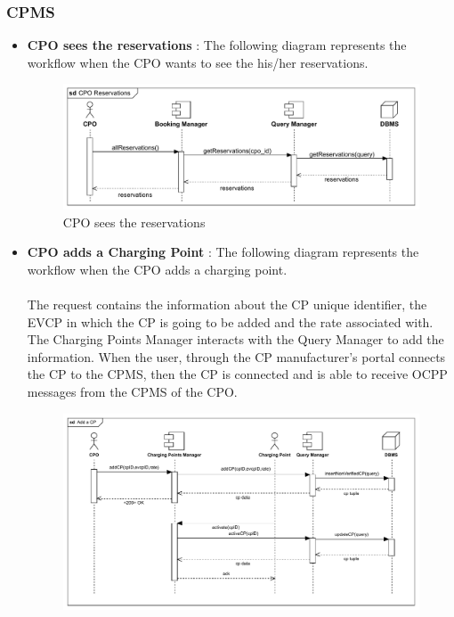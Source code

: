 \subsubsection{CPMS}
\begin{itemize}
    \item \textbf{CPO sees the reservations} : The following diagram represents the workflow when the CPO wants to see the his/her reservations.\\
          \begin{figure}[H]
              \centering
              \includegraphics[scale=0.55]{src/runtimeView/CPMS_Reservations.pdf}
              \caption{CPO sees the reservations}
          \end{figure}
          \pagebreak
    \item \textbf{CPO adds a Charging Point} : The following diagram represents the workflow when the CPO adds a charging point.\\
          \\ The request contains the information about the CP unique identifier, the EVCP in which the CP is going to be added and the rate associated with.
          The Charging Points Manager interacts with the Query Manager to add the information. When the user, through the CP manufacturer's portal connects the
          CP to the CPMS, then the CP is connected and is able to receive OCPP messages from the CPMS of the CPO.
          \begin{figure}[H]
              \centering
              \includegraphics[scale=0.55]{src/runtimeView/CPMS_AddCP.pdf}

\end{figure}
\end{itemize}
